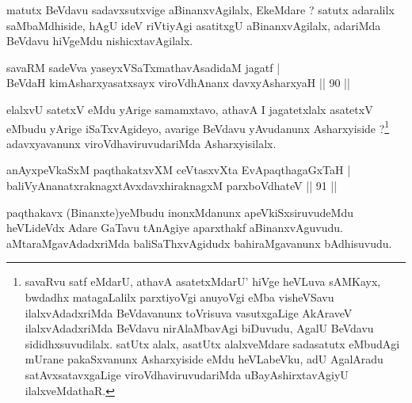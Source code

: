 \begin{artha}
matutx BeVdavu sadavxsutxvige aBinanxvAgilalx, EkeMdare ? satutx adaralilx saMbaMdhiside, hAgU ideV riVtiyAgi asatitxgU aBinanxvAgilalx, adariMda BeVdavu hiVgeMdu nishicxtavAgilalx.
\end{artha}



\begin{shl}
savaRM sadeVva yaseyxVSaTxmathavA\s  sadidaM jagatf  | \\
BeVdaH kimAsharxyasatxsayx viroVdhAnanx davxyAsharxyaH \hfill||  90 ||  
\end{shl}

\begin{artha}
elalxvU satetxV eMdu yArige samamxtavo, athavA I jagatetxlalx asatetxV eMbudu yArige iSaTxvAgideyo, avarige BeVdavu yAvudanunx Asharxyiside ?\footnote{savaRvu satf eMdarU, athavA asatetxMdarU' hiVge heVLuva sAMKayx, bwdadhx matagaLalilx parxtiyoVgi anuyoVgi eMba visheVSavu ilalxvAdadxriMda BeVdavanunx toVrisuva vasutxgaLige AkAraveV ilalxvAdadxriMda BeVdavu nirAlaMbavAgi biDuvudu, AgalU BeVdavu sididhxsuvudilalx. satUtx alalx, asatUtx alalxveMdare sadasatutx eMbudAgi mUrane pakaSxvanunx Asharxyiside eMdu heVLabeVku, adU AgalAradu satAvxsatavxgaLige viroVdhaviruvudariMda uBayAshirxtavAgiyU ilalxveMdathaR.} adavxyavanunx viroVdhaviruvudariMda Asharxyisilalx.
\end{artha}


\begin{shl}
\footnotemark{}anAyxpeVkaSxM paqthakatxvXM ceVtasxvXta EvApaqthagaGxTaH  | \\
baliVyAnanatxraknagxtAvxdavxhiraknagxM parxboVdhateV \hfill||  91 ||  
\end{shl}

\begin{artha}
paqthakavx (Binanxte)yeMbudu inonxMdanunx apeVkiSxsiruvudeMdu heVLideVdx Adare GaTavu tAnAgiye aparxthakf aBinanxvAguvudu. aMtaraMgavAdadxriMda baliSaThxvAgidudx bahiraMgavanunx bAdhisuvudu.
\end{artha}


